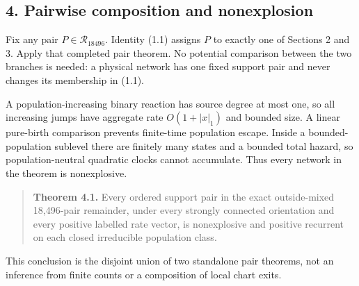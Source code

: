 \subsection{4. Pairwise composition and
nonexplosion}

Fix any pair \(P\in\mathcal R_{18496}\). Identity (1.1) assigns \(P\) to
exactly one of Sections 2 and 3. Apply that completed pair theorem. No
potential comparison between the two branches is needed: a physical
network has one fixed support pair and never changes its membership in
(1.1).

A population-increasing binary reaction has source degree at most one,
so all increasing jumps have aggregate rate \(O(1+|x|_1)\) and bounded
size. A linear pure-birth comparison prevents finite-time population
escape. Inside a bounded-population sublevel there are finitely many
states and a bounded total hazard, so population-neutral quadratic
clocks cannot accumulate. Thus every network in the theorem is
nonexplosive.

\begin{quote}
\textbf{Theorem 4.1.} Every ordered support pair in the exact
outside-mixed 18,496-pair remainder, under every strongly connected
orientation and every positive labelled rate vector, is nonexplosive and
positive recurrent on each closed irreducible population class.
\end{quote}

This conclusion is the disjoint union of two standalone pair theorems,
not an inference from finite counts or a composition of local chart
exits.

